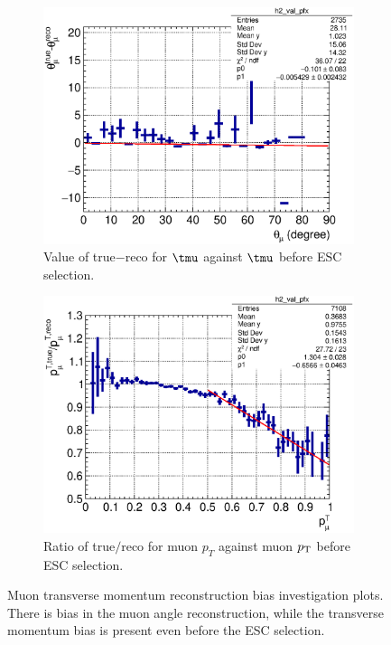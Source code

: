      \begin{figure}[ht]
     \centering
     \begin{subfigure}{\dbfigwid\textwidth}
          \centering
          \includegraphics[width=\textwidth]{figures/sel/theta_mu_vs_theta_mu_res_hist2d_al14.eps}
          \caption{Value of true$-$reco for $\tmu$ against $\tmu$ before ESC selection.}
          \label{subfig:esc-mutheta}
     \end{subfigure}
     \begin{subfigure}{\dbfigwid\textwidth}
          \centering
          \includegraphics[width=\textwidth]{figures/sel/mu_pt_vs_mu_pt_bias_hist2d_al13.eps}
          \caption{Ratio of true$/$reco for muon $p_T$ against muon $p_\textrm{T}$ before ESC selection.}
          \label{subfig:esc-mupt-bfesc}
     \end{subfigure}
     \caption{Muon transverse momentum reconstruction bias investigation plots. There is bias in the muon angle reconstruction, while the transverse momentum bias is present even before the ESC selection.}
     \label{fig:esc-muptcor}
     \end{figure}

